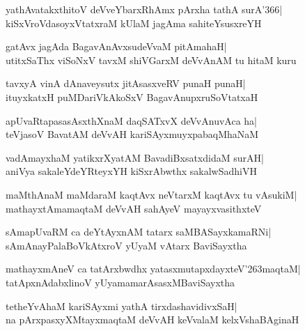 \documentclass[twoside,12pt,openright]{book}
\def\S{\char'263}
\newcounter{shloka}[chapter]
\begin{document}
\begin{shloka}%
yathAvatakxthitoV deVveYbarxRhAmx pArxha tathA surA\char'366|\\
kiSxVroVdasoyxVtatxraM kUlaM jagAma sahiteYsusxreYH
\end{shloka}

\begin{shloka}%
gatAvx jagAda BagavAnAvxsudeVvaM pitAmahaH|\\
utitxSaThx viSoNxV tavxM shiVGarxM deVvAnAM tu hitaM kuru
\end{shloka}

\begin{shloka}%
tavxyA vinA dAnaveysutx jitAsasxveRV punaH punaH|\\
ituyxkatxH puMDariVkAkoSxV BagavAnupxruSoVtatxaH
\end{shloka}

\begin{shloka}%
apUvaRtapasasAsxthXnaM daqSATxvX deVvAnuvAca ha|\\
teVjasoV BavatAM deVvAH kariSAyxmuyxpabaqMhaNaM
\end{shloka}

\begin{shloka}%
vadAmayxhaM yatikxrXyatAM BavadiBxsatxdidaM surAH|\\
aniVya sakaleYdeYRteyxYH kiSxrAbwthx sakalwSadhiVH
\end{shloka}

\begin{shloka}%
maMthAnaM maMdaraM kaqtAvx neVtarxM kaqtAvx tu vAsukiM|\\
mathayxtAmamaqtaM deVvAH sahAyeV mayayxvasithxteV
\end{shloka}

\begin{shloka}%
sAmapUvaRM ca deYtAyxnAM tatarx saMBASayxkamaRNi|\\
sAmAnayPalaBoVkAtxroV yUyaM vAtarx BaviSayxtha
\end{shloka}

\begin{shloka}%
mathayxmAneV ca tatArxbwdhx yatasxmutapxdayxteV\S maqtaM|\\
tatApxnAdabxlinoV yUyamamarAsasxMBaviSayxtha
\end{shloka}

\begin{shloka}%
tetheYvAhaM kariSAyxmi yathA tirxdashavidivxSaH|\\
na pArxpasxyXMtayxmaqtaM deVvAH keVvalaM kelxVshaBAginaH
\end{shloka}
\end{document}
